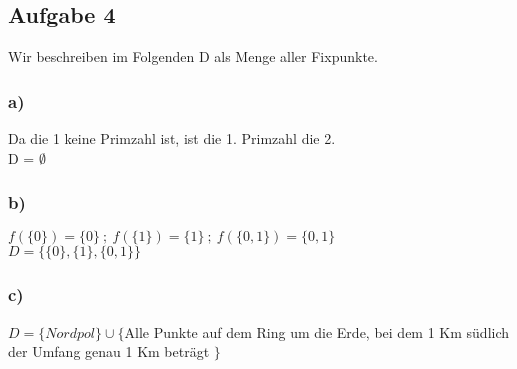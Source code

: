 \documentclass[10pt,a4paper,german,landscape,fleqn]{article} \usepackage[utf8]{inputenc} %
\begin{document}
\newpage


\subsection*{Aufgabe 4}
Wir beschreiben im Folgenden D als Menge aller Fixpunkte.
\subsubsection*{a)}
Da die 1 keine Primzahl ist, ist die 1. Primzahl die 2.\\
D = $\emptyset$
\subsubsection*{b)}
$f(\{0\})=\{0\} \ ; \ f(\{1\})=\{1\} \ ; \ f(\{0,1\})=\{0,1\}$\\
$D=\{ \{0\},\{1\},\{0,1\}\}$\\
\subsubsection*{c)}
$D=\{Nordpol\} \cup \{$Alle Punkte auf dem Ring um die Erde, bei dem 1 Km südlich der Umfang genau 1 Km beträgt $\} $\\
\end{document}
